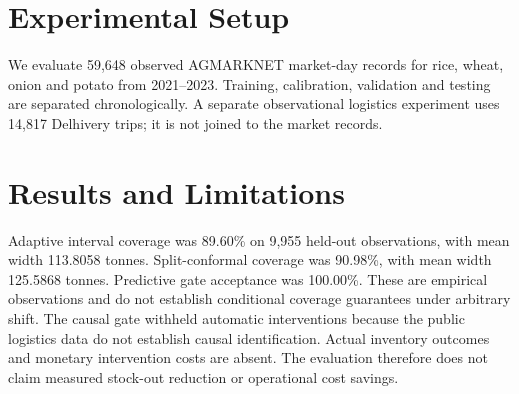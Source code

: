 \section{Experimental Setup}
We evaluate 59,648 observed AGMARKNET market-day records for rice, wheat, onion and potato from 2021--2023. Training, calibration, validation and testing are separated chronologically. A separate observational logistics experiment uses 14,817 Delhivery trips; it is not joined to the market records.
\section{Results and Limitations}
Adaptive interval coverage was 89.60\% on 9,955 held-out observations, with mean width 113.8058 tonnes. Split-conformal coverage was 90.98\%, with mean width 125.5868 tonnes. Predictive gate acceptance was 100.00\%. These are empirical observations and do not establish conditional coverage guarantees under arbitrary shift.
The causal gate withheld automatic interventions because the public logistics data do not establish causal identification. Actual inventory outcomes and monetary intervention costs are absent. The evaluation therefore does not claim measured stock-out reduction or operational cost savings.

